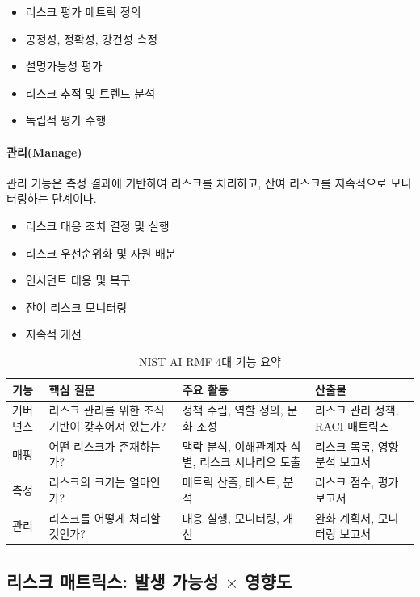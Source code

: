 \begin{itemize}
 \item 리스크 평가 메트릭 정의
 \item 공정성, 정확성, 강건성 측정
 \item 설명가능성 평가
 \item 리스크 추적 및 트렌드 분석
 \item 독립적 평가 수행
\end{itemize}

\paragraph{관리(Manage)}
관리 기능은 측정 결과에 기반하여 리스크를 처리하고, 잔여 리스크를 지속적으로 모니터링하는 단계이다.

\begin{itemize}
 \item 리스크 대응 조치 결정 및 실행
 \item 리스크 우선순위화 및 자원 배분
 \item 인시던트 대응 및 복구
 \item 잔여 리스크 모니터링
 \item 지속적 개선
\end{itemize}

\begin{table}[htbp]
\centering
\caption{NIST AI RMF 4대 기능 요약}
\label{tab:nist_functions}
\begin{tabularx}{\textwidth}{p{2cm}p{2.5cm}p{3cm}X}
\toprule
\textbf{기능} & \textbf{핵심 질문} & \textbf{주요 활동} & \textbf{산출물} \\
\midrule
거버넌스 & 리스크 관리를 위한 조직 기반이 갖추어져 있는가? & 정책 수립, 역할 정의, 문화 조성 & 리스크 관리 정책, RACI 매트릭스 \\
\midrule
매핑 & 어떤 리스크가 존재하는가? & 맥락 분석, 이해관계자 식별, 리스크 시나리오 도출 & 리스크 목록, 영향 분석 보고서 \\
\midrule
측정 & 리스크의 크기는 얼마인가? & 메트릭 산출, 테스트, 분석 & 리스크 점수, 평가 보고서 \\
\midrule
관리 & 리스크를 어떻게 처리할 것인가? & 대응 실행, 모니터링, 개선 & 완화 계획서, 모니터링 보고서 \\
\bottomrule
\end{tabularx}
\end{table}

\subsection{리스크 매트릭스: 발생 가능성 $\times$ 영향도}
\label{sec:5.3.3}

